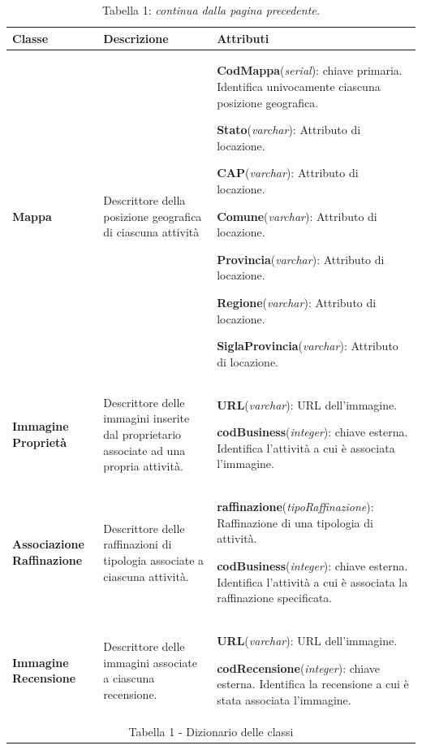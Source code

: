 \documentclass[a4paper,12pt]{article}
\begin{document}
\newpage\null{}\setcounter{page}{6}
\vspace{-2cm}
\begin{table}[htbp]
\caption*{Tabella 1: {\it continua dalla pagina precedente.}}
\begin{tabular}[c]{| m{3cm} | m{5cm} | m{7cm} |}
\hline
\bf Classe&\bf Descrizione&\bf Attributi\\
\hline
{\bf Mappa}
&\small Descrittore della posizione geografica di ciascuna attività
&\footnotesize

{\bf CodMappa}({\it serial}): chiave primaria. Identifica univocamente ciascuna posizione geografica.

{\bf Stato}({\it varchar}): Attributo di locazione.

{\bf CAP}({\it varchar}): Attributo di locazione.

{\bf Comune}({\it varchar}): Attributo di locazione.

{\bf Provincia}({\it varchar}): Attributo di locazione.

{\bf Regione}({\it varchar}): Attributo di locazione.

{\bf SiglaProvincia}({\it varchar}): Attributo di locazione.
\\
\hline

{\bf Immagine
Proprietà}
&\small Descrittore delle immagini inserite dal proprietario associate ad una propria
attività.
&\footnotesize
{\bf URL}({\it varchar}): URL dell'immagine.

{\bf codBusiness}({\it integer}): chiave esterna. Identifica l'attività a
cui è associata l'immagine.
\\
\hline

{\bf Associazione
Raffinazione}
&\small Descrittore delle raffinazioni di tipologia associate a ciascuna attività.
&\footnotesize
{\bf raffinazione}({\it tipoRaffinazione}): Raffinazione di una tipologia di attività.

{\bf codBusiness}({\it integer}): chiave esterna. Identifica l'attività a
cui è associata la raffinazione specificata.
\\
\hline

{\bf Immagine
Recensione}
&\small Descrittore delle immagini associate a ciascuna recensione.
&\footnotesize
{\bf URL}({\it varchar}): URL dell'immagine.

{\bf codRecensione}({\it integer}): chiave esterna. Identifica la recensione a 
cui è stata associata l'immagine.
\\
\hline
\multicolumn{3}{c}{\footnotesize{\normalsize Tabella 1 - Dizionario delle classi}}
\end{tabular}
\end{table}
\newpage
\end{document}

